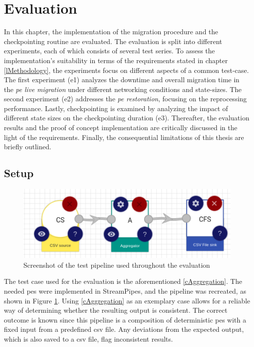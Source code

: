 \section{Evaluation}
\label{lEvaluation}

In this chapter, the implementation of the migration procedure and the checkpointing routine are evaluated. The evaluation is split into different experiments, each of which consists of several test series. To assess the implementation's suitability in terms of the requirements stated in chapter \ref{lMethodology}, the experiments focus on different aspects of a common test-case. The first experiment (\acrshort{e}1) analyzes the downtime and overall migration time in the \textit{\acrshort{pe} live migration} under different networking conditions and state-sizes. The second experiment (\acrshort{e}2) addresses the \textit{\acrshort{pe} restoration}, focusing on the reprocessing performance. Lastly, checkpointing is examined by analyzing the impact of different state sizes on the checkpointing duration (\acrshort{e}3). Thereafter, the evaluation results and the proof of concept implementation are critically discussed in the light of the requirements. Finally, the consequential limitations of this thesis are briefly outlined.

\subsection{Setup}

\label{lEvaluationSetup}
\begin{figure}[!ht]
    \centering
    \graphicspath{{./figures/code/}}
    \includegraphics[width=\textwidth]{figures/visualizations/EvaluationPipelineSceenshot_1500.png}
    \caption{Screenshot of the test pipeline used throughout the evaluation}
    \label{fEvaluationPipeline}
\end{figure}

The test case used for the evaluation is the aforementioned \ref{cAggregation}. The needed \gls{pe}s were implemented in StreamPipes, and the pipeline was recreated, as shown in Figure \ref{fEvaluationPipeline}. Using \ref{cAggregation} as an exemplary case allows for a reliable way of determining whether the resulting output is consistent. The correct outcome is known since this pipeline is a composition of deterministic \gls{pe}s with a fixed input from a predefined \gls{csv} file. Any deviations from the expected output, which is also saved to a \gls{csv} file, flag inconsistent results.\par


